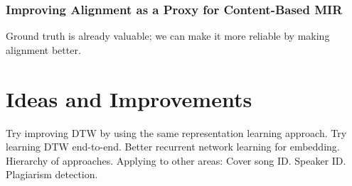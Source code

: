 \subsubsection{Improving Alignment as a Proxy for Content-Based MIR}

Ground truth is already valuable; we can make it more reliable by making alignment better.

\section{Ideas and Improvements}
\label{sec:ideas}

Try improving DTW by using the same representation learning approach.
Try learning DTW end-to-end.
Better recurrent network learning for embedding.
Hierarchy of approaches.
Applying to other areas: Cover song ID.  Speaker ID.  Plagiarism detection.
